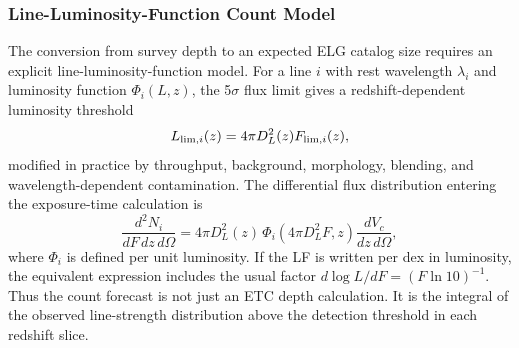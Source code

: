 \documentclass[10pt,onecolumn]{article}
\begin{document}
\subsubsection{Line-Luminosity-Function Count Model}

The conversion from survey depth to an expected ELG catalog size requires an explicit line-luminosity-function model. For a line $i$ with rest wavelength $\lambda_i$ and luminosity function $\Phi_i(L,z)$, the 5$\sigma$ flux limit gives a redshift-dependent luminosity threshold
\begin{equation}
  L_{{\rm lim},i}(z)=4\pi D_L^2(z)F_{{\rm lim},i}(z),
\end{equation}
modified in practice by throughput, background, morphology, blending, and wavelength-dependent contamination. The differential flux distribution entering the exposure-time calculation is
\begin{equation}
  \frac{d^2N_i}{dF\,dz\,d\Omega}
  =
  4\pi D_L^2(z)\,
  \Phi_i\!\left(4\pi D_L^2F,z\right)
  \frac{dV_c}{dz\,d\Omega},
\end{equation}
where $\Phi_i$ is defined per unit luminosity. If the LF is written per dex in luminosity, the equivalent expression includes the usual factor $d\log L/dF=(F\ln10)^{-1}$. Thus the count forecast is not just an ETC depth calculation. It is the integral of the observed line-strength distribution above the detection threshold in each redshift slice.
\end{document}
